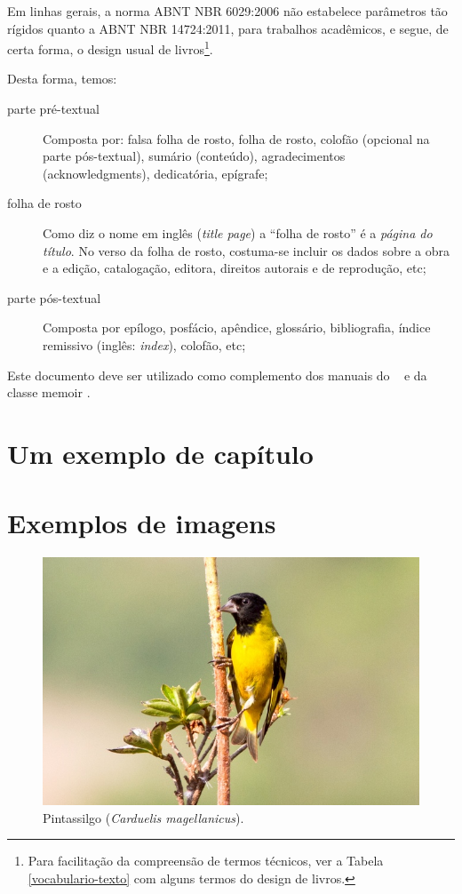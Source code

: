 \documentclass[
	10pt,				%
	openright,			%
	twoside,			%
	a5paper,			%
	english,			%
	french,				%
	spanish,			%
	brazil,				%
	sumario=tradicional
]{abntex2}
\begin{document}
Em linhas gerais, a norma ABNT NBR 6029:2006 não estabelece parâmetros tão
rígidos quanto a ABNT NBR 14724:2011, para trabalhos acadêmicos, e segue, de
certa forma, o design usual de livros\footnote{Para facilitação da compreensão
de termos técnicos, ver a Tabela \ref{vocabulario-texto} com alguns termos do
design de livros.}.

Desta forma, temos:

\begin{description}
\item[parte pré-textual] Composta por: falsa folha de rosto, folha de rosto,
colofão (opcional na parte pós-textual), sumário (conteúdo),
a\-gra\-de\-ci\-men\-tos (acknowledgments), dedicatória, epígrafe;
\item[folha de rosto] Como diz o nome em inglês (\textit{title page}) a ``folha
de rosto'' é a \textit{página do título}. No verso da folha de rosto, costuma-se
incluir os dados sobre a obra e a edição, catalogação, editora, direitos
autorais e de reprodução, etc;
\item [parte pós-textual] Composta por epílogo, posfácio, apêndice, glossário,
bibliografia, índice remissivo (inglês: \textit{index}), colofão, etc;

\end{description}

Este documento deve ser utilizado como complemento dos manuais do \abnTeX\ 
\cite{abntex2classe,abntex2cite,abntex2cite-alf} e da classe \textsf{memoir}
\cite{memoir}. 

  
\chapter{Um exemplo de capítulo}

\lipsum[1-10]

\chapter{Exemplos de imagens}

\lipsum[1]

\begin{figure}
\centering
\includegraphics[width=0.6\linewidth]{abntex2-modelo-livro-pintassilgo}
\caption{Pintassilgo (\textit{Carduelis magellanicus}).}
\label{fig:pintassilgo}
\end{figure}
\end{document}
